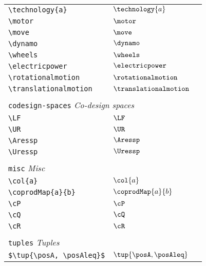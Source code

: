 \begin{longtable}{lll}
 {\color[rgb]{0.5,0.5,0.5}\texttt{\textbackslash technology\{a\}}} & $\technology{a}$ & \\ 
 {\color[rgb]{0.5,0.5,0.5}\texttt{\textbackslash motor}} & $\motor$ & \\ 
 {\color[rgb]{0.5,0.5,0.5}\texttt{\textbackslash move}} & $\move$ & \\ 
 {\color[rgb]{0.5,0.5,0.5}\texttt{\textbackslash dynamo}} & $\dynamo$ & \\ 
 {\color[rgb]{0.5,0.5,0.5}\texttt{\textbackslash wheels}} & $\wheels$ & \\ 
 {\color[rgb]{0.5,0.5,0.5}\texttt{\textbackslash electricpower}} & $\electricpower$ & \\ 
 {\color[rgb]{0.5,0.5,0.5}\texttt{\textbackslash rotationalmotion}} & $\rotationalmotion$ & \\ 
 {\color[rgb]{0.5,0.5,0.5}\texttt{\textbackslash translationalmotion}} & $\translationalmotion$ & \\ 
  &  & \\ 
 \multicolumn{3}{l}{{\color[rgb]{0.5,0.5,0.5}\texttt{codesign-spaces}} \emph{Co-design spaces}}\\ 
 \hline
\hline
{\color[rgb]{0.5,0.5,0.5}\texttt{\textbackslash LF}} & $\LF$ & \\ 
 {\color[rgb]{0.5,0.5,0.5}\texttt{\textbackslash UR}} & $\UR$ & \\ 
 {\color[rgb]{0.5,0.5,0.5}\texttt{\textbackslash Aressp}} & $\Aressp$ & \\ 
 {\color[rgb]{0.5,0.5,0.5}\texttt{\textbackslash Uressp}} & $\Uressp$ & \\ 
  &  & \\ 
 \multicolumn{3}{l}{{\color[rgb]{0.5,0.5,0.5}\texttt{misc}} \emph{Misc}}\\ 
 \hline
\hline
{\color[rgb]{0.5,0.5,0.5}\texttt{\textbackslash col\{a\}}} & $\col{a}$ & \\ 
 {\color[rgb]{0.5,0.5,0.5}\texttt{\textbackslash coprodMap\{a\}\{b\}}} & $\coprodMap{a}{b}$ & \\ 
 {\color[rgb]{0.5,0.5,0.5}\texttt{\textbackslash cP}} & $\cP$ & \\ 
 {\color[rgb]{0.5,0.5,0.5}\texttt{\textbackslash cQ}} & $\cQ$ & \\ 
 {\color[rgb]{0.5,0.5,0.5}\texttt{\textbackslash cR}} & $\cR$ & \\ 
  &  & \\ 
 \multicolumn{3}{l}{{\color[rgb]{0.5,0.5,0.5}\texttt{tuples}} \emph{Tuples}}\\ 
 \hline
\hline
{\color[rgb]{0.5,0.5,0.5}\texttt{\$\textbackslash tup\{\textbackslash posA, \textbackslash posAleq\}\$}} & $\tup{\posA, \posAleq}$ & \\ 

\end{longtable}
